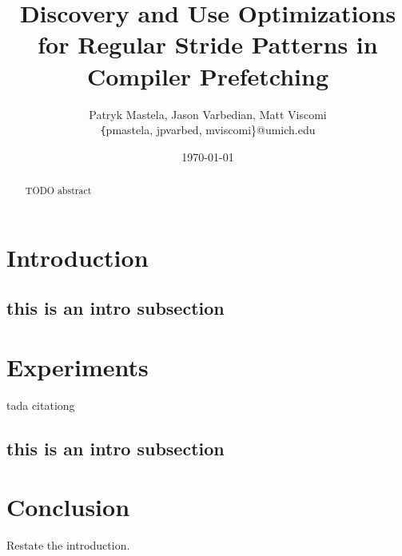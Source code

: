 \documentclass[11pt]{article}
\title{Discovery and Use Optimizations for Regular Stride Patterns in Compiler Prefetching}
\author{Patryk Mastela, Jason Varbedian, Matt Viscomi \\
\small \texttt \{pmastela, jpvarbed, mviscomi\}@umich.edu}
\date{\today}
\begin{document}
  \maketitle
  \begin{abstract}
    TODO abstract
  \end{abstract}
  
  \section{Introduction}
  \subsection{this is an intro subsection}
  
  \section{Experiments}
  tada citationg ~\cite{Wu2002}
  \subsection{this is an intro subsection}

  \section{Conclusion}
  Restate the introduction.

  {}
  
\end{document}

